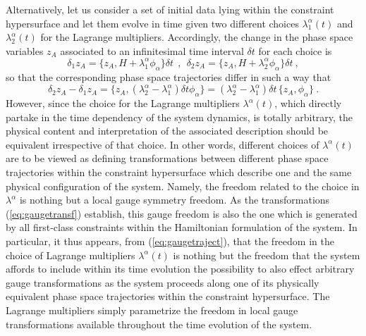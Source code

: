 \documentclass[a4paper,11pt]{article}
\begin{document}
Alternatively, let us consider a set of initial data lying within the
constraint hypersurface and let them evolve in time given two different
choices $\lambda^\alpha_1(t)$ and $\lambda^\alpha_2(t)$ for the Lagrange 
multipliers. Accordingly, the change in the phase space variables $z_A$
associated to an infinitesimal time interval $\delta t$ for each choice is
\begin{equation}
\delta_1z_A=\{z_A,H+\lambda^\alpha_1\phi_\alpha\}\delta t\ \ ,\ \ 
\delta_2z_A=\{z_A,H+\lambda^\alpha_2\phi_\alpha\}\delta t\ ,
\end{equation}
so that the corresponding phase space trajectories differ in such a way that
\begin{equation}
\delta_2z_A-\delta_1z_A=
\{z_A,(\lambda^\alpha_2-\lambda^\alpha_1)\delta t\phi_\alpha\}=
(\lambda^\alpha_2-\lambda^\alpha_1)\delta t\,\{z_A,\phi_\alpha\}\ .
\label{eq:gaugetraject}
\end{equation}
However, since the choice for the Lagrange multipliers $\lambda^\alpha(t)$,
which directly partake in the time dependency of the system dynamics, is
totally arbitrary, the physical content and interpretation of the
associated description should be equivalent irrespective of that choice.
In other words, different choices of $\lambda^\alpha(t)$ are to be viewed
as defining transformations between different phase space trajectories within
the constraint hypersurface which describe one and the same physical
configuration of the system. Namely, the freedom related to the choice
in $\lambda^\alpha$ is nothing but a local gauge symmetry freedom.
As the transformations (\ref{eq:gaugetransf}) establish, this gauge
freedom is also the one which is generated by all first-class constraints
within the Hamiltonian formulation of the system. In particular, it thus
appears, from (\ref{eq:gaugetraject}), that the freedom in the choice of
Lagrange multipliers $\lambda^\alpha(t)$ is nothing but the freedom that
the system affords to include within its time evolution the possibility
to also effect arbitrary gauge transformations as the system proceeds
along one of its physically equivalent phase space trajectories within
the constraint hypersurface. The Lagrange multipliers simply parametrize
the freedom in local gauge transformations available throughout the
time evolution of the system.
\end{document}
